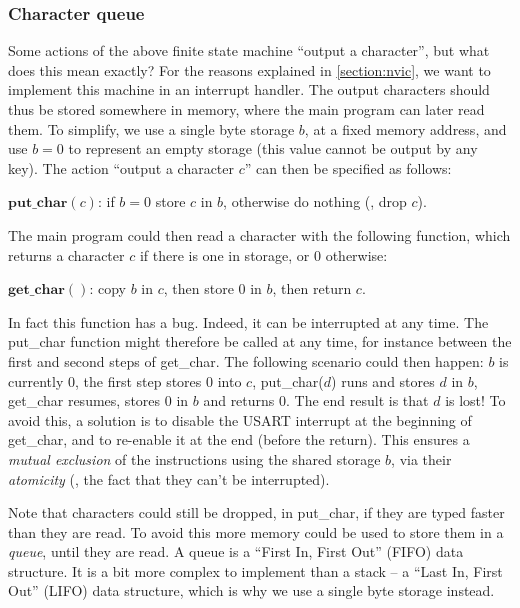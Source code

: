 \subsubsection{Character queue}

Some actions of the above finite state machine ``output a character'', but what
does this mean exactly? For the reasons explained in \cref{section:nvic}, we
want to implement this machine in an interrupt handler. The output characters
should thus be stored somewhere in memory, where the main program can later
read them. To simplify, we use a single byte storage $b$, at a fixed memory
address, and use $b=0$ to represent an empty storage (this value cannot
be output by any key). The action ``output a character $c$'' can then be
specified as follows:

\begin{flushleft}
  $\mathbf{put\_char}(c)$: if $b=0$ store $c$ in $b$, otherwise do nothing
  (\ie, drop $c$).
\end{flushleft}

The main program could then read a character with the following function, which
returns a character $c$ if there is one in storage, or 0 otherwise:

\begin{flushleft}
  $\mathbf{get\_char}()$: copy $b$ in $c$, then store 0 in $b$, then return
  $c$.
\end{flushleft}

In fact this function has a bug. Indeed, it can be interrupted at any time. The
put\_char function might therefore be called at any time, for instance between
the first and second steps of get\_char. The following scenario could then
happen: $b$ is currently 0, the first step stores 0 into $c$, put\_char($d$)
runs and stores $d$ in $b$, get\_char resumes, stores $0$ in $b$ and returns 0.
The end result is that $d$ is lost! To avoid this, a solution is to disable the
USART interrupt at the beginning of get\_char, and to re-enable it at the end
(before the return). This ensures a {\em mutual exclusion} of the instructions
using the shared storage $b$, via their {\em atomicity} (\ie, the fact that
they can't be interrupted).

Note that characters could still be dropped, in put\_char, if they are typed
faster than they are read. To avoid this more memory could be used to store
them in a {\em queue}, until they are read. A queue is a ``First In, First
Out'' (FIFO) data structure. It is a bit more complex to implement than a stack
-- a ``Last In, First Out'' (LIFO) data structure, which is why we use a single
byte storage instead.

